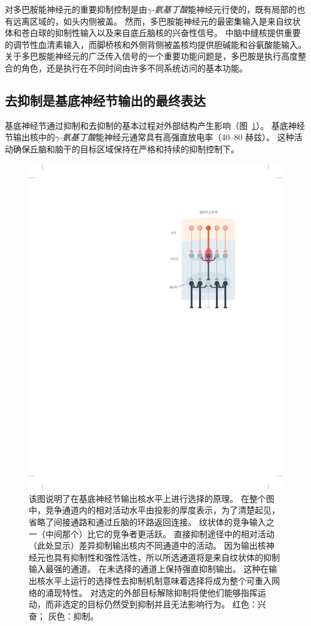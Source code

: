 对多巴胺能神经元的重要抑制控制是由\textit{$\gamma$-氨基丁酸}能神经元行使的，既有局部的也有远离区域的，如头内侧被盖。
然而，多巴胺能神经元的最密集输入是来自纹状体和苍白球的抑制性输入以及来自底丘脑核的兴奋性信号。
中脑中缝核提供重要的调节性血清素输入，而脚桥核和外侧背侧被盖核均提供胆碱能和谷氨酸能输入。
关于多巴胺能神经元的广泛传入信号的一个重要功能问题是，多巴胺是执行高度整合的角色，还是执行在不同时间由许多不同系统访问的基本功能。



\subsection{去抑制是基底神经节输出的最终表达}

基底神经节通过抑制和去抑制的基本过程对外部结构产生影响（图~\ref{fig:38_6}）。
基底神经节输出核中的\textit{$\gamma$-氨基丁酸}能神经元通常具有高强直放电率（40–80 赫兹）。
这种活动确保丘脑和脑干的目标区域保持在严格和持续的抑制控制下。


\begin{figure}[htbp]
	\centering
	\includegraphics[width=0.45\linewidth]{chap38/fig_38_6}
	\caption{该图说明了在基底神经节输出核水平上进行选择的原理。
		在整个图中，竞争通道内的相对活动水平由投影的厚度表示，为了清楚起见，省略了间接通路和通过丘脑的环路返回连接。
		纹状体的竞争输入之一（中间那个）比它的竞争者更活跃。
		直接抑制途径中的相对活动（此处显示）差异抑制输出核内不同通道中的活动。
		因为输出核神经元也具有抑制性和强性活性，所以所选通道将是来自纹状体的抑制输入最强的通道。
		在未选择的通道上保持强直抑制输出。
		这种在输出核水平上运行的选择性去抑制机制意味着选择将成为整个可重入网络的涌现特性。
		对选定的外部目标解除抑制将使他们能够指挥运动，而非选定的目标仍然受到抑制并且无法影响行为。 红色：兴奋； 灰色：抑制。}
	\label{fig:38_6}
\end{figure}


